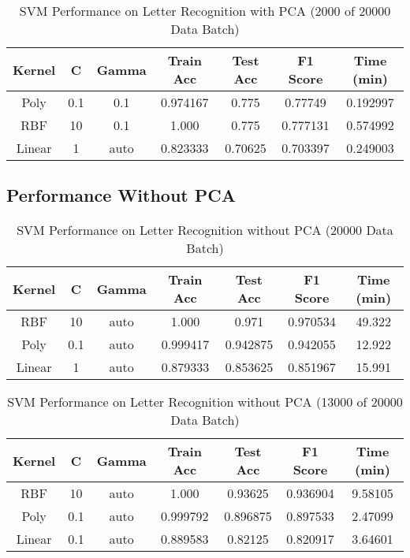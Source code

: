 \documentclass[conference]{IEEEtran}
\begin{document}
\begin{table}[H]
\centering
\caption{SVM Performance on Letter Recognition with PCA (2000 of 20000 Data Batch)}
\begin{tabular}{|c|c|c|c|c|c|c|}
\hline
Kernel & C & Gamma & Train Acc & Test Acc & F1 Score & Time (min) \\ \hline
Poly & 0.1 & 0.1 & 0.974167 & 0.775 & 0.77749 & 0.192997 \\ \hline
RBF & 10 & 0.1 & 1.000 & 0.775 & 0.777131 & 0.574992 \\ \hline
Linear & 1 & auto & 0.823333 & 0.70625 & 0.703397 & 0.249003 \\ \hline
\end{tabular}
\end{table}



\subsection{Performance Without PCA}


\begin{table}[H]
\centering
\caption{SVM Performance on Letter Recognition without PCA (20000 Data Batch)}
\begin{tabular}{|c|c|c|c|c|c|c|}
\hline
Kernel & C & Gamma & Train Acc & Test Acc & F1 Score & Time (min) \\ \hline
RBF & 10 & auto & 1.000 & 0.971 & 0.970534 & 49.322 \\ \hline
Poly & 0.1 & auto & 0.999417 & 0.942875 & 0.942055 & 12.922 \\ \hline
Linear & 1 & auto & 0.879333 & 0.853625 & 0.851967 & 15.991 \\ \hline

\end{tabular}
\end{table}



\begin{table}[H]
\centering
\caption{SVM Performance on Letter Recognition without PCA (13000 of 20000 Data Batch)}

\begin{tabular}{|c|c|c|c|c|c|c|}
\hline
Kernel & C & Gamma & Train Acc & Test Acc & F1 Score & Time (min) \\ \hline
RBF & 10 & auto & 1.000 & 0.93625 & 0.936904 & 9.58105 \\ \hline
Poly & 0.1 & auto & 0.999792 & 0.896875 & 0.897533 & 2.47099 \\ \hline
Linear & 0.1 & auto & 0.889583 & 0.82125 & 0.820917 & 3.64601 \\ \hline

\end{tabular}
\end{table}
\end{document}
